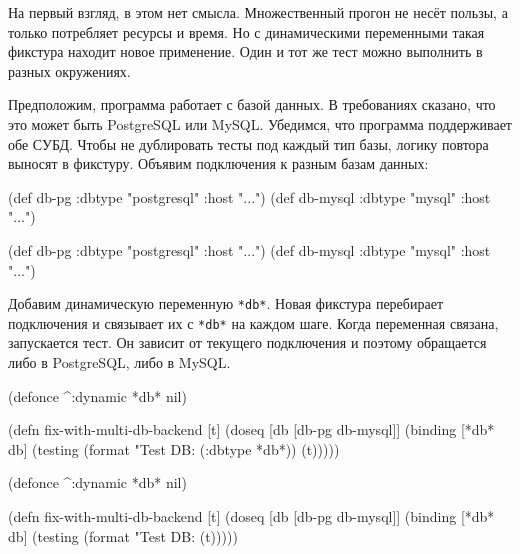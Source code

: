 На первый взгляд, в этом нет смысла. Множественный прогон не несёт пользы, а
только потребляет ресурсы и время. Но с динамическими переменными такая фикстура
находит новое применение. Один и тот же тест можно выполнить в разных
окружениях.

Предположим, программа работает с базой данных. В требованиях сказано, что это
может быть PostgreSQL или MySQL. Убедимся, что программа поддерживает обе
СУБД. Чтобы не дублировать тесты под каждый тип базы, логику повтора выносят в
фикстуру. Объявим подключения к разным базам данных:

\ifnarrow

\begin{english}
  \begin{clojure}
(def db-pg
  {:dbtype "postgresql" :host "..."})
(def db-mysql
  {:dbtype "mysql"      :host "..."})
  \end{clojure}
\end{english}

\else

\begin{english}
  \begin{clojure}
(def db-pg    {:dbtype "postgresql" :host "..."})
(def db-mysql {:dbtype "mysql"      :host "..."})
  \end{clojure}
\end{english}

\fi

Добавим динамическую переменную \verb|*db*|. Новая фикстура перебирает
подключения и связывает их с \verb|*db*| на каждом шаге. Когда переменная
связана, запускается тест. Он зависит от текущего подключения и поэтому
обращается либо в PostgreSQL, либо в MySQL.

\ifnarrow

\begin{english}
  \begin{clojure}
(defonce ^:dynamic *db* nil)

(defn fix-with-multi-db-backend [t]
  (doseq [db [db-pg db-mysql]]
    (binding [*db* db]
      (testing
        (format "Test DB: %
          (:dbtype *db*))
        (t)))))
  \end{clojure}
\end{english}

\else

\begin{english}
  \begin{clojure}
(defonce ^:dynamic *db* nil)

(defn fix-with-multi-db-backend [t]
  (doseq [db [db-pg db-mysql]]
    (binding [*db* db]
      (testing (format "Test DB: %
        (t)))))
  \end{clojure}
\end{english}

